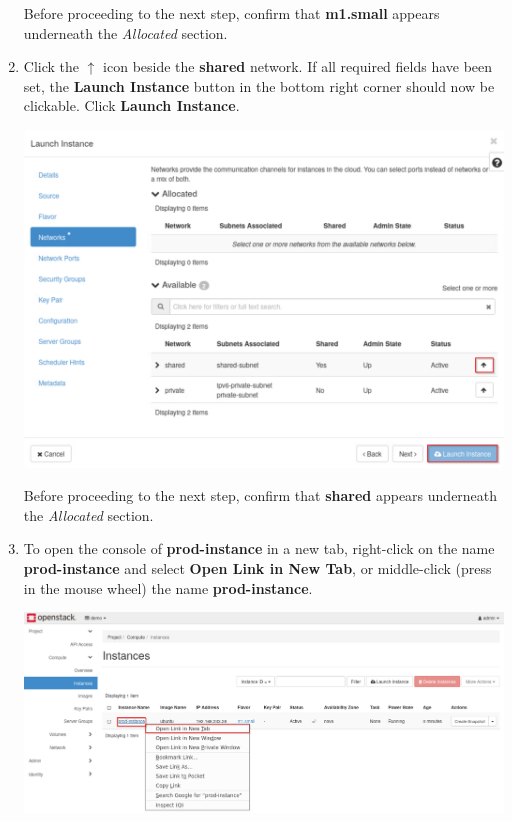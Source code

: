 \documentclass[letterpaper, 12pt]{article}
\begin{document}
\begin{enumerate}
    \begin{stopbox}
        Before proceeding to the next step, confirm that \textbf{m1.small} appears underneath the \textit{Allocated}
        section.
    \end{stopbox}

    \item Click the $\uparrow$ icon beside the \textbf{shared} network. If all required fields have been set, the
    \textbf{Launch Instance} button in the bottom right corner should now be clickable. Click \textbf{Launch Instance}.

    \begin{center}
        \includegraphics[width=\linewidth]{images/part1/step9.png}
    \end{center}

    \begin{stopbox}
        Before proceeding to the next step, confirm that \textbf{shared} appears underneath the \textit{Allocated}
        section.
    \end{stopbox}

    \item To open the console of \textbf{prod-instance} in a new tab, right-click on the name \textbf{prod-instance} and
    select \textbf{Open Link in New Tab}, or middle-click (press in the mouse wheel) the name \textbf{prod-instance}.

    \begin{center}
        \includegraphics[width=\linewidth]{images/part1/step10.png}
    \end{center}


\end{enumerate}
\end{document}
